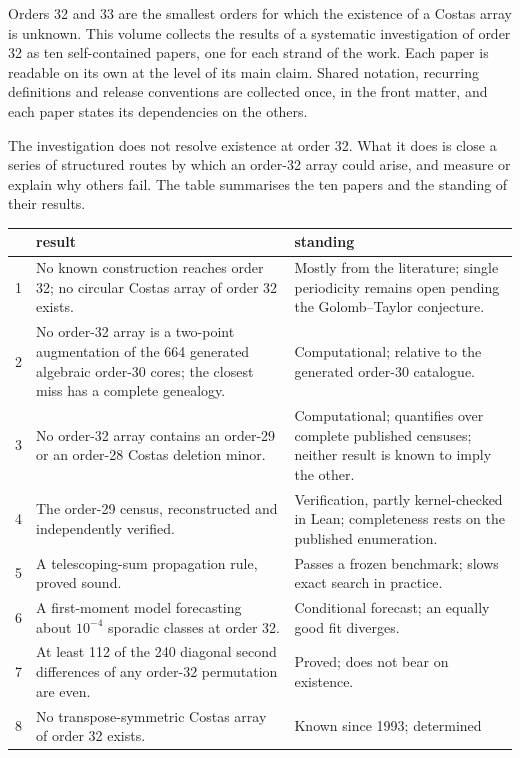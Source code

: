 \documentclass[11pt,a4paper,oneside]{report}
\theoremstyle{definition}
\begin{document}
Orders 32 and 33 are the smallest orders for which the existence of a Costas array is unknown. This
volume collects the results of a systematic investigation of order 32 as ten self-contained
papers, one for each strand of the work. Each paper is readable on its own at the level of its main claim. Shared notation, recurring definitions and release conventions are collected once, in the front matter, and each paper states its dependencies on the others.

The investigation does not resolve existence at order 32. What it does is close a series of
structured routes by which an order-32 array could arise, and measure or explain why others fail.
The table summarises the ten papers and the standing of their results.

\begin{center}
\small
\begin{tabular}{@{}p{}>{\raggedright\arraybackslash}p{}>{\raggedright\arraybackslash}p{}@{}}
\toprule
& result & standing \\
\midrule
1 & No known construction reaches order 32; no circular Costas array of order 32 exists. &
Mostly from the literature; single periodicity remains open pending the Golomb--Taylor conjecture. \\
2 & No order-32 array is a two-point augmentation of the 664 generated algebraic order-30 cores;
the closest miss has a complete genealogy. & Computational; relative to the generated order-30
catalogue. \\
3 & No order-32 array contains an order-29 or an order-28 Costas deletion minor. &
Computational; quantifies over complete published censuses; neither result is known to imply the other. \\
4 & The order-29 census, reconstructed and independently verified. & Verification, partly
kernel-checked in Lean; completeness rests on the published enumeration. \\
5 & A telescoping-sum propagation rule, proved sound. & Passes a frozen benchmark; slows exact search
in practice. \\
6 & A first-moment model forecasting about $10^{-4}$ sporadic classes at order 32. & Conditional
forecast; an equally good fit diverges. \\
7 & At least 112 of the 240 diagonal second differences of any order-32 permutation are even. &
Proved; does not bear on existence. \\
8 & No transpose-symmetric Costas array of order 32 exists. & Known since 1993; determined

\end{tabular}
\end{center}
\end{document}
